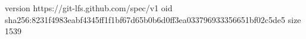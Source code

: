 version https://git-lfs.github.com/spec/v1
oid sha256:8231f4983eabf4345ff1f1bf67d65b0b6d0ff3ea033796933356651bf02c5de5
size 1539
